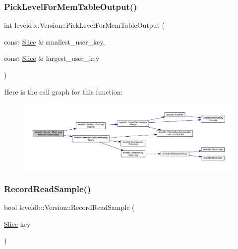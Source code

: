 \subsubsection{\texorpdfstring{PickLevelForMemTableOutput()}{PickLevelForMemTableOutput()}}
{\footnotesize\ttfamily int leveldb\+::\+Version\+::\+Pick\+Level\+For\+Mem\+Table\+Output (\begin{DoxyParamCaption}\item[{const \mbox{\hyperlink{classleveldb_1_1_slice}{Slice}} \&}]{smallest\+\_\+user\+\_\+key,  }\item[{const \mbox{\hyperlink{classleveldb_1_1_slice}{Slice}} \&}]{largest\+\_\+user\+\_\+key }\end{DoxyParamCaption})}

Here is the call graph for this function\+:
\nopagebreak
\begin{figure}[H]
\begin{center}
\leavevmode
\includegraphics[width=350pt]{classleveldb_1_1_version_ac3b623319110ed2a9491723dd4675431_cgraph}
\end{center}
\end{figure}
\mbox{\label{classleveldb_1_1_version_a8b9e51b3d0503fe5868f656356557ded}} 
\subsubsection{\texorpdfstring{RecordReadSample()}{RecordReadSample()}}
{\footnotesize\ttfamily bool leveldb\+::\+Version\+::\+Record\+Read\+Sample (\begin{DoxyParamCaption}\item[{\mbox{\hyperlink{classleveldb_1_1_slice}{Slice}}}]{key }\end{DoxyParamCaption})}

